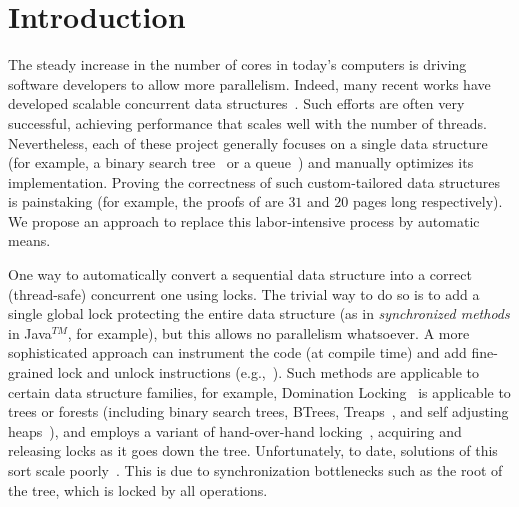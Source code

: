 
\section{Introduction} \label{sec:intro}

The steady increase in the number of  cores in today's computers is driving software developers to allow more parallelism.
Indeed, many recent works have developed scalable concurrent data
structures~\cite{ArbelA2014,DrachslerVY2014,NatarajanM2014,BrownER2014,CrainGR2013,BraginskyP2012,
AfekKKMT2012,EllenFRB2010,BronsonCCO2010,HerlihyLLS2007,Michael:1996}.
Such efforts are often very successful, achieving performance that scales well
with the number of threads.
Nevertheless, each of these project generally focuses on a single data structure
(for example, a binary search tree~\cite{ArbelA2014} or a queue~\cite{Michael:1996}) and manually optimizes its implementation.
Proving the correctness of such custom-tailored data structures is painstaking
(for example, the proofs of \cite{BraginskyP2012,EllenFRB2010} are $31$ and $20$ pages long
respectively). We propose an approach to replace this labor-intensive process by automatic means.

One way to automatically convert a sequential data structure into a correct (thread-safe) concurrent one using locks.
The trivial way to do so is to add a single global lock protecting the entire data structure
(as in \emph{synchronized methods} in Java$^{TM}$, for example), but this allows no parallelism whatsoever.
A more sophisticated approach can instrument the code (at compile time) and add
fine-grained lock and unlock instructions (e.g.,~\cite{Gueta2011,MZGB:POPL06}). Such
methods are applicable to certain data structure families, for example,
Domination Locking~\cite{Gueta2011} is applicable to trees or forests
(including binary search trees, BTrees, Treaps~\cite{AragonS1989}, and self adjusting heaps~\cite{Sleator:SAH1986:SAH}),
and employs a variant of hand-over-hand locking~\cite{SilberschatzK1980},
acquiring and releasing locks as it goes down the tree.
Unfortunately, to date, solutions of this sort scale poorly~\cite{Gueta2011}.
This is due to synchronization bottlenecks such as the root of the tree,
which is locked by all operations.

